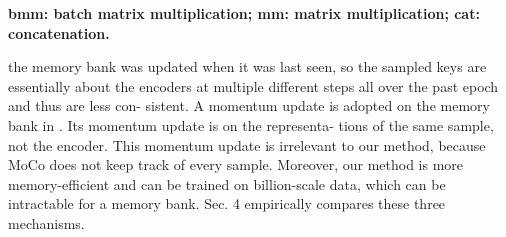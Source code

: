 \documentclass[10pt,twocolumn]{article}  %
\begin{document}
\vspace{-2.6em} %
\textbf{\small bmm: batch matrix multiplication; mm: matrix multiplication; cat: concatenation.}

the memory bank was updated when it was last seen, so the
sampled keys are essentially about the encoders at multiple
different steps all over the past epoch and thus are less con-
sistent. A momentum update is adopted on the memory
bank in \cite{61_wu2018unsupervised}. Its momentum update is on the representa-
tions of the same sample, not the encoder. This momentum
update is irrelevant to our method, because MoCo does not
keep track of every sample. Moreover, our method is more
memory-efficient and can be trained on billion-scale data,
which can be intractable for a memory bank.
Sec. 4 empirically compares these three mechanisms.
\end{document}
